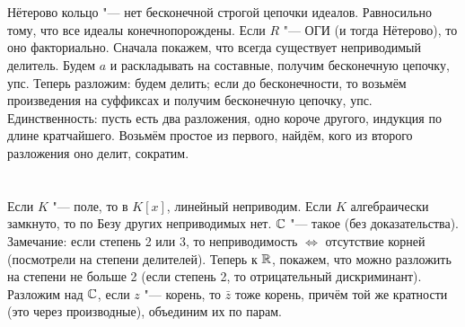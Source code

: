 \section{} %
Нётерово кольцо "--- нет бесконечной строгой цепочки идеалов.
Равносильно тому, что все идеалы конечнопорождены.
Если $R$ "--- ОГИ (и тогда Нётерово), то оно факториально.
Сначала покажем, что всегда существует неприводимый делитель.
Будем $a$ и раскладывать на составные, получим бесконечную цепочку, упс.
Теперь разложим: будем делить; если до бесконечности, то возьмём произведения на суффиксах и получим бесконечную цепочку, упс.
Единственность: пусть есть два разложения, одно короче другого, индукция по длине кратчайшего.
Возьмём простое из первого, найдём, кого из второго разложения оно делит, сократим.

\section{} %
Если $K$ "--- поле, то в $K[x]$, линейный неприводим.
Если $K$ алгебраически замкнуто, то по Безу других неприводимых нет.
$\mathbb{C}$ "--- такое (без доказательства).
Замечание: если степень 2 или 3, то неприводимость $\iff$ отсутствие корней (посмотрели на степени делителей).
Теперь к $\mathbb{R}$, покажем, что можно разложить на степени не больше 2 (если степень 2, то отрицательный дискриминант).
Разложим над $\mathbb{C}$, если $z$ "--- корень, то $\bar z$ тоже корень, причём той же кратности (это через производные), объединим их по парам.
